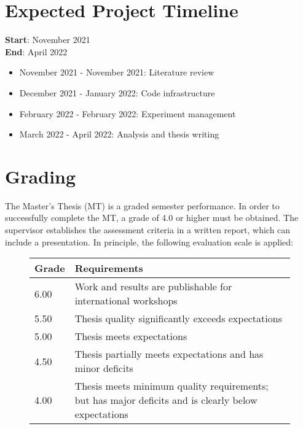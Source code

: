 \documentclass{article}
\begin{document}
\section{Expected Project Timeline}
{\bf Start}:  November 2021
\\
{\bf End}:  April 2022

\begin{itemize}
    \item  November 2021 -  November 2021: Literature review
    \item  December 2021 -  January 2022: Code infrastructure
    \item  February 2022 -  February 2022: Experiment management
    \item  March 2022 -  April 2022: Analysis and thesis writing
\end{itemize}


\section{Grading}

The Master's Thesis (MT) is a graded semester performance. In order to successfully complete the MT, a grade of 4.0 or higher must be obtained.  The supervisor establishes the assessment criteria in a written report, which can include a presentation. In principle, the following evaluation scale is applied: 
\begin{figure}[h!]
    \begin{tabular}{|l|l|}
        \hline  Grade & Requirements  \\ \hline \hline
        6.00  & Work and results are publishable for international workshops  \\ \hline
        5.50 & Thesis quality significantly exceeds expectations  \\ \hline
        5.00 & Thesis meets expectations  \\ \hline
        4.50 & Thesis partially meets expectations and has minor deficits   \\ \hline
        4.00 & Thesis meets minimum quality requirements; but has major deficits  and  is  clearly  below expectations \\ \hline 
    \end{tabular}
\end{figure}

{}
\end{document}
